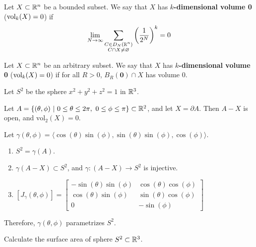 \begin{definition}
    Let $X \subset \mathbb{R}^n$ be a bounded subset.  We say that $X$ has $k$\textbf{-dimensional volume 0} ($\textnormal{vol}_k(X) = 0$) if
    $$\lim_{N \to \infty} \sum_{\substack{C \in D_N(\mathbb{R}^n) \\ C \cap X \neq \varnothing}} \left(\frac{1}{2^N}\right)^k = 0$$
    
    \end{definition}
    

    
    \begin{definition}
    Let $X \subset \mathbb{R}^n$ be an arbitrary subset.  We say that $X$ has $k$\textbf{-dimensional volume 0} ($\textnormal{vol}_k(X) = 0$) if for all $R > 0$, $B_R(\bm{0}) \cap X$ has volume 0.
    
    \end{definition}

    \begin{example}
    Let $S^2$ be the sphere $x^2+y^2+z^2=1$ in $\mathbb{R}^3$.

\vspace{1em}

    Let $A = \{(\theta, \phi) \ | \ 0 \leq \theta \leq  2\pi, \ 0 \leq \phi \leq  \pi\} \subset \mathbb{R}^2$, and let $X = \partial A$.  Then $A-X$ is open, and $\text{vol}_2(X) = 0$.

    Let $\gamma(\theta, \phi) = \langle \cos(\theta)\sin(\phi), \sin(\theta)\sin(\phi), \cos(\phi) \rangle$.

    
        \begin{enumerate}
        
        \item $S^2 = \gamma(A)$.
        \item $\gamma(A-X) \subset S^2$, and $\gamma : (A-X) \to S^2$ is injective. 
        
        \item $[J_\gamma(\theta, \phi)] = 
\begin{bmatrix}
-\sin(\theta)\sin(\phi) & \cos(\theta)\cos(\phi) \\
\cos(\theta)\sin(\phi) & \sin(\theta)\cos(\phi) \\
0 & -\sin(\phi)
\end{bmatrix}$
    \end{enumerate}

    
    Therefore, $\gamma(\theta, \phi)$ parametrizes $S^2$.
    \end{example}

\begin{example}
    Calculate the surface area of sphere $S^2 \subset \mathbb{R}^3$.
\end{example}



